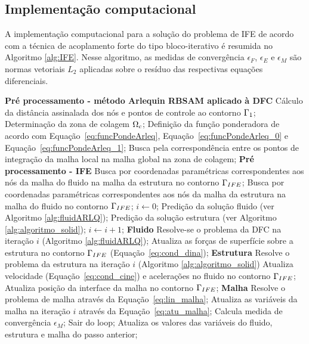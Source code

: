 \subsection{Implementação computacional} 

A implementação computacional para a solução do problema de IFE de acordo com a técnica de acoplamento forte do tipo bloco-iterativo é resumida no Algoritmo \ref{alg:IFE}. Nesse algoritmo, as medidas de convergência $\epsilon_F$, $\epsilon_E$ e $\epsilon_M$ são normas vetoriais $L_2$ aplicadas sobre o resíduo das respectivas equações diferenciais.

\begin{algorithm}
	\caption{Algoritmo para solução de problemas IFE}
	\label{alg:IFE}
	\begin{algorithmic}[1]
		\State \textbf{Pré processamento - método Arlequin RBSAM aplicado à DFC}
		\State Cálculo da distância assinalada dos nós e pontos de controle ao contorno $\Gamma_1$;
		\State Determinação da zona de colagem $\Omega_c$;
		\State Definição da função ponderadora de acordo com Equação~\eqref{eq:funcPondeArleq}, Equação~\eqref{eq:funcPondeArleq_0} e Equação~\eqref{eq:funcPondeArleq_1};
		\State Busca pela correspondência entre os pontos de integração da malha local na malha global na zona de colagem;
		\State \textbf{Pré processamento - IFE}
		\State Busca por coordenadas paramétricas correspondentes aos nós da malha do fluido na malha da estrutura no contorno $\Gamma_{IFE}$;
		\State Busca por coordenadas paramétricas correspondentes aos nós da malha da estrutura na malha do fluido no contorno $\Gamma_{IFE}$;
		\State $i \gets 0$;
		\State Predição da solução fluido (ver Algoritmo \ref{alg:fluidARLQ});
		\State Predição da solução estrutura (ver Algoritmo \ref{alg:algoritmo_solid});		
		\State $i\gets i+1$;
		\State \textbf{Fluido}
		\State Resolve-se o problema da DFC na iteração $i$ (Algoritmo \ref{alg:fluidARLQ});
		\State Atualiza as forças de superfície sobre a estrutura no contorno $\Gamma_{IFE}$ (Equação~\eqref{eq:cond_dina});
		\State \textbf{Estrutura}
		\State Resolve o problema da estrutura na iteração $i$ (Algoritmo \ref{alg:algoritmo_solid})
		\State Atualiza velocidade (Equação~\eqref{eq:cond_cine}) e acelerações no fluido no contorno $\Gamma_{IFE}$;
		\State Atualiza posição da interface da malha no contorno  $\Gamma_{IFE}$;
		\State \textbf{Malha}
		\State Resolve o problema de malha através da Equação~\eqref{eq:lin_malha};
		\State Atualiza as variáveis da malha na iteração $i$ através da Equação~\eqref{eq:atu_malha};
		\State Calcula medida de convergência $\epsilon_M$;
		\State Sair do loop;
		\EndIf
		\EndWhile
		\State Atualiza os valores das variáveis do fluido, estrutura e malha do passo anterior;
		\EndFor
	\end{algorithmic}
\end{algorithm}

